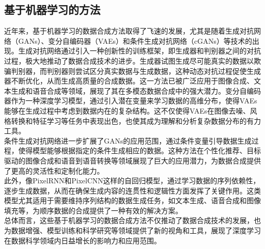 \documentclass{NauThesis}
\begin{document}
\subsection{基于机器学习的方法}
近年来，基于机器学习的数据合成方法取得了飞速的发展，尤其是随着生成对抗网络（GANs）、变分自编码器（VAEs）和条件生成对抗网络（cGANs）等技术的出现。生成对抗网络通过引入一种创新性的训练框架，即生成器和判别器之间的对抗过程，极大地推动了数据合成技术的进步。生成器试图生成尽可能真实的数据以欺骗判别器，而判别器则尝试区分真实数据与生成数据，这种动态对抗过程促使生成器不断优化，从而生成高质量的合成数据。这一方法已被广泛应用于图像合成、文本生成和语音合成等领域，展现了其在多模态数据合成中的强大潜力\cite{ref35,ref36,ref37}。变分自编码器作为一种深度学习模型，通过引入潜在变量来学习数据的高维分布，使得VAEs能够在生成过程中考虑到数据内在的复杂结构。这不仅使得VAEs在图像去噪、风格转换和特征学习等任务中表现出色，也使其成为理解和分析复杂数据分布的有力工具\cite{ref38,ref39}。\\\hspace*{2em}条件生成对抗网络进一步扩展了GANs的应用范围，通过条件变量引导数据生成过程，使得模型能够根据指定的条件生成相应的数据。这种方法在个性化推荐、目标驱动的图像合成和语音到语音转换等领域展现了巨大的应用潜力，为数据合成提供了更高的灵活性和定制化能力\cite{ref40,ref41}。\\\hspace*{2em}此外，像PixelRNN和PixelCNN这样的自回归模型，通过学习数据的序列依赖性，逐步生成数据，从而在确保生成内容的连贯性和逻辑性方面发挥了关键作用。这类模型尤其适用于需要维持序列结构的数据生成任务，如文本生成、语音合成和图像填充等，为顺序数据的合成提供了一种有效的解决方案\cite{ref42,ref43,ref44}。\\\hspace*{2em}总体而言，这些基于机器学习的数据合成方法不仅推动了数据合成技术的发展，也为数据增强、模型训练和科学研究等领域提供了新的视角和工具，展现了深度学习在数据科学领域内日益增长的影响力和应用范围。
\end{document}
